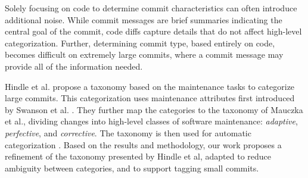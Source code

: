 Solely focusing on code to determine commit characteristics can often introduce additional noise. While commit messages are brief summaries indicating the central goal of the commit, code diffs capture details that do not affect high-level categorization. Further, determining commit type, based entirely on code, becomes difficult on extremely large commits, where a commit message may provide all of the information needed.

Hindle et al. \cite{Hindle_cate} propose a taxonomy based on the maintenance tasks to categorize large commits.
This categorization uses maintenance attributes first introduced by Swanson et al. \cite{Swanson}.
They further map the categories to the taxonomy of Mauczka et al.\cite{Mauczka}, dividing changes into high-level classes of software maintenance: \textit{adaptive}, \textit{perfective}, and \textit{corrective}. The taxonomy is then used for automatic categorization \cite{Hindle_auto}. Based on the results and methodology, our work proposes a refinement of the taxonomy presented by Hindle et al, adapted to reduce ambiguity between categories, and to support tagging small commits.


